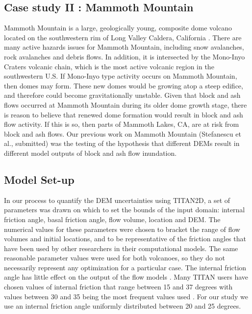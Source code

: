 \documentclass[12pt]{article}
\begin{document}
\subsection{Case study II : Mammoth Mountain}

Mammoth Mountain is a large, geologically young, composite dome
volcano located on the southwestern rim of Long Valley Caldera,
California \citep{Bailey1989}.  There are many active hazards issues
for Mammoth Mountain, including snow avalanches, rock avalanches and
debris flows. In addition, it is intersected by the Mono-Inyo Craters
volcanic chain, which is the most active volcanic region in the
southwestern U.S.  If Mono-Inyo type activity occurs on Mammoth
Mountain, then domes may form.  These new domes would be growing atop
a steep edifice, and therefore could become gravitationally unstable.
Given that block and ash flows occurred at Mammoth Mountain during its
older dome growth stage, there is reason to believe that renewed dome
formation would result in block and ash flow activity. If this is so,
then parts of Mammoth Lakes, CA, are at risk from block and ash flows.
Our previous work on Mammoth Mountain (Stefanescu et al., submitted)
was the testing of the hypothesis that different DEMs result in
different model outputs of block and ash flow inundation.

\subsection{Model Set-up}

In our process to quantify the DEM uncertainties using TITAN2D, a set
of parameters was drawn on which to set the bounds of the input
domain: internal friction angle, basal friction angle, flow volume,
location and DEM. The numerical values for these parameters were
chosen to bracket the range of flow volumes and initial locations, and
to be representative of the friction angles that have been used by
other researchers in their computational models.  The same reasonable
parameter values were used for both volcanoes, so they do not
necessarily represent any optimization for a particular case.  The
internal friction angle has little effect on the output of the flow
models \citep{Keith, sheridan_2005}. Many TITAN users have chosen
values of internal friction that range between 15 and 37 degrees with
values between 30 and 35 being the most frequent values used
\citep{Patra2005, murcia_2010}.  For our study we use an internal
friction angle uniformly distributed between 20 and 25 degrees.
\end{document}
